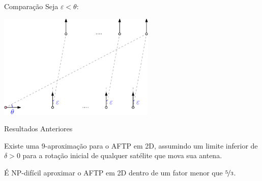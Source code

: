 \begin{frame}{Comparação}
  \centering
  Seja $\varepsilon < \theta$:

  \bigskip
  \begin{minipage}{\linewidth}
    \centering
    \includegraphics[height=5cm]{AFTP/makespan.png}
  \end{minipage}

  \bigbreak
  \bigbreak
\end{frame}


\begin{frame}{Resultados Anteriores}
  \begin{thm}
    Existe uma $9$-aproximação para o AFTP em 2D, assumindo um limite inferior de $\delta>0$ para a rotação inicial de qualquer satélite que mova sua antena.
  \end{thm}

  \pause
  \begin{thm}
    É NP-difícil aproximar o AFTP em 2D dentro de um fator menor que $\nicefrac{5}{3}$.
  \end{thm}
\end{frame}

